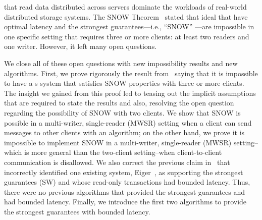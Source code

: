 \rots{} that read data distributed across servers dominate the workloads of real-world distributed storage systems.
The SNOW Theorem~\cite{SNOW2016} stated that ideal \rots{} that have optimal latency and the strongest guarantees---i.e., ``SNOW'' \rots{}---are impossible in one specific setting that requires three or more clients: at least two readers and one writer. However, it left many open questions.

We close all of these open questions with new impossibility results and new algorithms.
First, we prove rigorously the result from~\cite{SNOW2016} saying that it is impossible to have a \rot{}s system that satisfies SNOW properties with three or more clients.
The insight we gained from this proof led to teasing out the implicit assumptions that are required to state the results and also, resolving the open question regarding the possibility of SNOW with two clients.
We show that SNOW  is possible in a multi-writer, single-reader (MWSR) setting when a client can send messages to other clients with an algorithm;
on the other hand, we prove it is impossible to implement SNOW in a multi-writer, single-reader (MWSR) setting--which is more general than the two-client setting--when client-to-client communication is disallowed.
We also correct the previous claim in~\cite{SNOW2016} that incorrectly identified one existing system, Eiger~\cite{Lloyd:nsdi2013}, as supporting the strongest guarantees (SW) and whose read-only transactions had bounded latency. Thus, there were no previous algorithms that provided the strongest guarantees and had bounded latency. Finally, we introduce the first two algorithms to provide the strongest guarantees with bounded latency.






